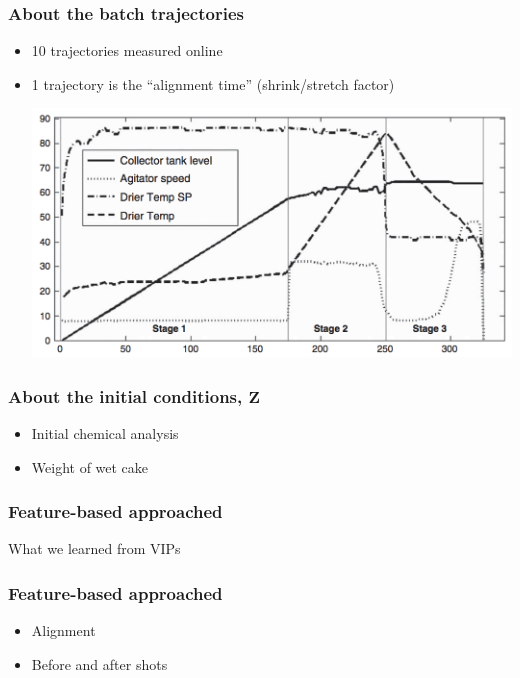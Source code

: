 \begin{frame}\frametitle{About the batch trajectories}

\begin{itemize}
	\item	10 trajectories measured online
	
	\item	1 trajectory is the ``alignment time'' (shrink/stretch factor)
	
	\begin{center}
		\includegraphics[width=\textwidth]{images/fmc/fmc-phases-4-trajectories.png}
	\end{center}	
	
\end{itemize}
\end{frame}

\begin{frame}\frametitle{About the initial conditions, \( \mathbf{Z}\)}

\begin{itemize}
	\item	Initial chemical analysis
	
	\item	Weight of wet cake
\end{itemize}

\end{frame}

\begin{frame}\frametitle{Feature-based approached}

What we learned from VIPs

\end{frame}

\begin{frame}\frametitle{Feature-based approached}

	\begin{itemize}
		\item	Alignment
		\item	Before and after shots
	\end{itemize}


\end{frame}
